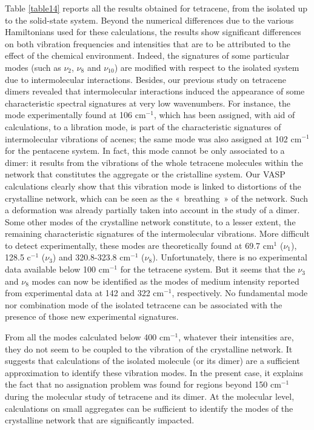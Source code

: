  Table \ref{table14} reports all the results obtained for tetracene, from the isolated up to the solid-state system. Beyond the numerical differences due to the various Hamiltonians used for these calculations, the results show significant differences on both vibration frequencies and intensities that are to be attributed to the effect of the chemical environment. Indeed, the signatures of some particular modes (such as $\nu_{2}$, $\nu_{8}$ and $\nu_{10}$) are modified with respect to the isolated system due to intermolecular interactions. Besides, our previous study on tetracene dimers revealed that intermolecular interactions induced the appearance of some characteristic spectral signatures at very low wavenumbers. For instance, the mode experimentally found at 106 cm$^{-1}$, which has been assigned, with aid of calculations, to a libration mode, is part of the characteristic signatures of intermolecular vibrations of acenes; the same mode was also assigned at 102 cm$^{-1}$ for the pentacene system. In fact, this mode cannot be only associated to a dimer: it results from the vibrations of the whole tetracene molecules within the network that constitutes the aggregate or the cristalline system. Our VASP calculations clearly show that this vibration mode is linked to distortions of the  crystalline network, which can be seen as the « breathing » of the network. Such a deformation was already partially taken into account in the study of a dimer. Some other modes of the crystalline network constitute, to a lesser extent, the remaining characteristic signatures of the intermolecular vibrations. More difficult to detect experimentally, these modes are theoretically found at 69.7 cm$^{1}$ ($\nu_{1}$), 128.5 c$^{-1}$ ($\nu_{3}$) and 320.8-323.8 cm$^{-1}$ ($\nu_{8}$). Unfortunately, there is no experimental data available below 100 cm$^{-1}$ for the tetracene system. But it seems that the $\nu_{3}$ and $\nu_{8}$ modes can now be identified as the modes of medium intensity reported from experimental data at 142 and 322 cm$^{-1}$, respectively. No fundamental mode nor combination mode of the isolated tetracene can be associated with the presence of those new experimental signatures.
 
 From all the modes calculated below 400 cm$^{-1}$, whatever their intensities are, they do not seem to be coupled to the vibration of the crystalline network. It suggests that calculations of the isolated molecule (or its dimer) are a sufficient approximation to identify these vibration modes. In the present case, it explains the fact that no assignation problem was found for regions beyond 150 cm$^{-1}$ during the molecular study of tetracene and its dimer. At the molecular level, calculations on small aggregates can be sufficient to identify the modes of the crystalline network that are significantly impacted.
 
